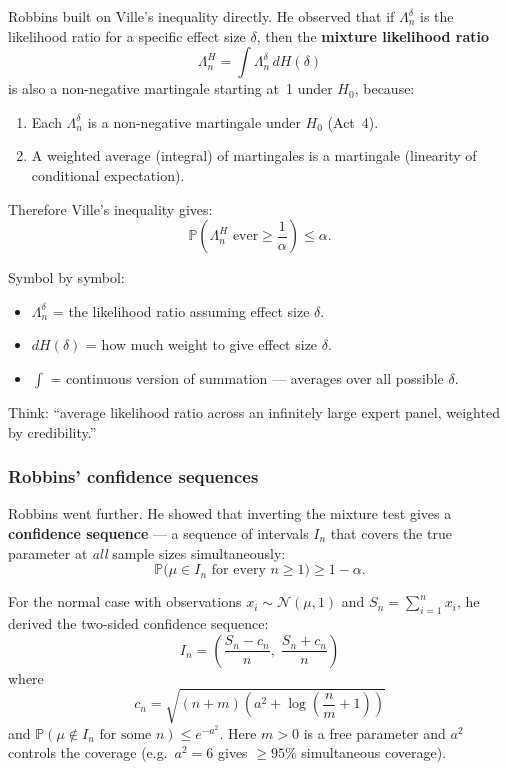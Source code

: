 \documentclass[12pt, a4paper]{article}
\newcommand{\Prob}{\mathbb{P}}         %
\newcommand{\LR}{\Lambda}              %
\begin{document}
Robbins built on Ville's inequality directly.  He observed that if $\LR_n^\delta$
is the likelihood ratio for a specific effect size $\delta$, then the
\textbf{mixture likelihood ratio}
\[
  \boxed{\LR_n^{H} = \int \LR_n^{\delta} \, dH(\delta)}
\]
is also a non-negative martingale starting at~1 under $H_0$, because:
\begin{enumerate}[nosep]
  \item Each $\LR_n^\delta$ is a non-negative martingale under $H_0$ (Act~4).
  \item A weighted average (integral) of martingales is a martingale
        (linearity of conditional expectation).
\end{enumerate}

Therefore Ville's inequality gives:
\[
  \Prob\!\left(\LR_n^{H} \text{ ever} \geq \frac{1}{\alpha}\right) \leq \alpha.
\]

\begin{plainlanguage}
Symbol by symbol:
\begin{itemize}[nosep]
  \item $\LR_n^{\delta}$ = the likelihood ratio assuming effect size $\delta$.
  \item $dH(\delta)$ = how much weight to give effect size $\delta$.
  \item $\int$ = continuous version of summation --- averages over all
        possible $\delta$.
\end{itemize}
Think: ``average likelihood ratio across an infinitely large expert panel,
weighted by credibility.''
\end{plainlanguage}

\subsubsection*{Robbins' confidence sequences}

Robbins went further.  He showed that inverting the mixture test gives a
\textbf{confidence sequence} --- a sequence of intervals $I_n$ that covers
the true parameter at \emph{all} sample sizes simultaneously:
\[
  \Prob\!\bigl(\mu \in I_n \text{ for every } n \geq 1\bigr) \geq 1 - \alpha.
\]

For the normal case with observations $x_i \sim \mathcal{N}(\mu, 1)$ and
$S_n = \sum_{i=1}^n x_i$, he derived the two-sided confidence sequence:
\[
  \boxed{I_n = \left(\frac{S_n - c_n}{n},\; \frac{S_n + c_n}{n}\right)}
\]
where
\[
  c_n = \sqrt{(n+m)\!\left(a^2 + \log\!\left(\frac{n}{m}+1\right)\right)}
\]
and $\Prob(\mu \notin I_n \text{ for some } n) \leq e^{-a^2}$.
Here $m > 0$ is a free parameter and $a^2$ controls the coverage (e.g.\
$a^2 = 6$ gives $\geq 95\%$ simultaneous coverage).
\end{document}
